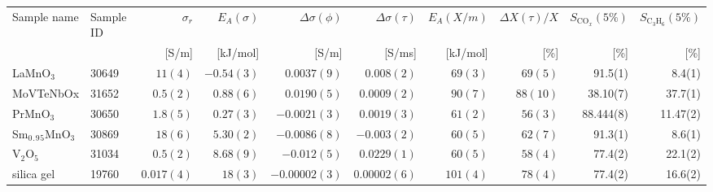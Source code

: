 \begin{tabular}{l|l|r|r|r|r|r|r|r|r}
Sample name & Sample ID & $\sigma_r$& $E_A(\sigma)$ & $\Delta \sigma (\phi)$ & $\Delta \sigma (\tau)$ & $E_A(X/m)$ & $\Delta X(\tau)/X$ & $S_{\mathrm{CO}_x}(5\%)$ & $S_{\mathrm{C}_3\mathrm{H}_6}(5\%)$\\
 & & [S/m] & [kJ/mol] & [S/m] & [S/ms] & [kJ/mol] & [\%] & [\%] & [\%]\\
\hline
LaMnO$_3$ & 30649 & $11(4)$ & $-0.54(3)$ & $0.0037(9)$ & $0.008(2)$ & $69(3)$  & $69(5)$& 91.5(1) & 8.4(1)\\
MoVTeNbOx & 31652 & $0.5(2)$ & $0.88(6)$ & $0.0190(5)$ & $0.0009(2)$ & $90(7)$  & $88(10)$& 38.10(7) & 37.7(1)\\
PrMnO$_3$ & 30650 & $1.8(5)$ & $0.27(3)$ & $-0.0021(3)$ & $0.0019(3)$ & $61(2)$  & $56(3)$& 88.444(8) & 11.47(2)\\
Sm$_0$$_.$$_9$$_5$MnO$_3$ & 30869 & $18(6)$ & $5.30(2)$ & $-0.0086(8)$ & $-0.003(2)$ & $60(5)$  & $62(7)$& 91.3(1) & 8.6(1)\\
V$_2$O$_5$ & 31034 & $0.5(2)$ & $8.68(9)$ & $-0.012(5)$ & $0.0229(1)$ & $60(5)$  & $58(4)$& 77.4(2) & 22.1(2)\\
silica gel & 19760 & $0.017(4)$ & $18(3)$ & $-0.00002(3)$ & $0.00002(6)$ & $101(4)$  & $78(4)$& 77.4(2) & 16.6(2)\\
\hline
\end{tabular}